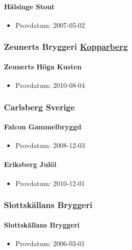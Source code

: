 \documentclass[11pt]{article}
\begin{document}
\paragraph{Hälsinge Stout}
\label{sec:org4771151}
\begin{itemize}
\item Provdatum: 2007-05-02
\end{itemize}
\subsubsection{Zeunerts Bryggeri \underline{Kopparberg}}
\label{sec:org752d171}
\paragraph{Zeunerts Höga Kusten}
\label{sec:orgbb845d6}
\begin{itemize}
\item Provdatum: 2010-08-04
\end{itemize}
\subsubsection{Carlsberg Sverige}
\label{sec:org58a2e80}
\paragraph{Falcon Gammelbryggd}
\label{sec:org8b167f7}
\begin{itemize}
\item Provdatum: 2008-12-03
\end{itemize}
\paragraph{Eriksberg Julöl}
\label{sec:org8cca545}
\begin{itemize}
\item Provdatum: 2010-12-01
\end{itemize}
\subsubsection{Slottskällans Bryggeri}
\label{sec:orgbf94f90}
\paragraph{Slottskällans Bryggeri}
\label{sec:orgd339af5}
\begin{itemize}
\item Provdatum: 2006-03-01
\end{itemize}
\end{document}
